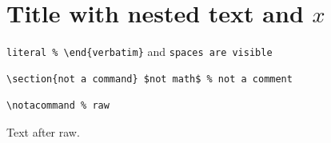 \make@letter
\def\my@command#1{Value #1}
\make@other
\section*{Title with {nested} text and $x$}
\verb|literal % \end{verbatim}| and \verb*+spaces are visible+
\begin{verbatim}
\section{not a command} $not math$ % not a comment
\end{verbatim}

\begin{lstlisting}
\notacommand % raw
\end{lstlisting}
Text after raw.
